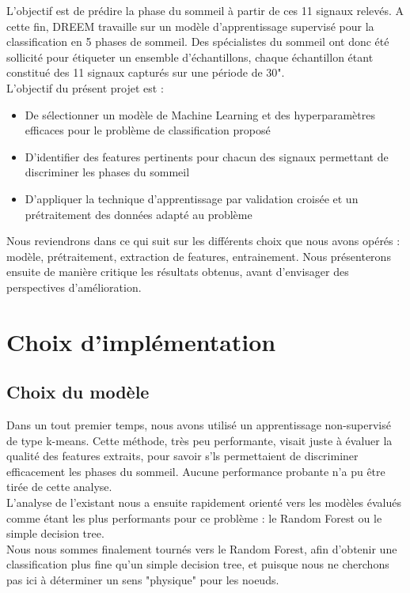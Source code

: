 \documentclass{article}
\begin{document}
L'objectif est de prédire la phase du sommeil à partir de ces 11 signaux relevés. A cette fin, DREEM travaille sur un modèle d'apprentissage supervisé pour la classification en 5 phases de sommeil. Des spécialistes du sommeil ont donc été sollicité pour étiqueter un ensemble d'échantillons, chaque échantillon étant constitué des 11 signaux capturés sur une période de 30".
\\
L'objectif du présent projet est :
\\
\begin{itemize}
\item De sélectionner un modèle de Machine Learning et des hyperparamètres efficaces pour le problème de classification proposé
\item D'identifier des features pertinents pour chacun des signaux permettant de discriminer les phases du sommeil
\item D'appliquer la technique d'apprentissage par validation croisée et un prétraitement des données adapté au problème
\end{itemize}
\vspace{0.5cm}

Nous reviendrons dans ce qui suit sur les différents choix que nous avons opérés : modèle, prétraitement, extraction de features, entrainement. Nous présenterons ensuite de manière critique les résultats obtenus, avant d'envisager des perspectives d'amélioration.

\section{Choix d'implémentation}
\subsection{Choix du modèle}

Dans un tout premier temps, nous avons utilisé un apprentissage non-supervisé de type k-means. Cette méthode, très peu performante, visait juste à évaluer la qualité des features extraits, pour savoir s'ls permettaient de discriminer efficacement les phases du sommeil. Aucune performance probante n'a pu être tirée de cette analyse.
\\

L'analyse de l'existant nous a ensuite rapidement orienté vers les modèles évalués comme étant les plus performants pour ce problème : le Random Forest ou le simple decision tree.
\\

Nous nous sommes finalement tournés vers le Random Forest, afin d'obtenir une classification plus fine qu'un simple decision tree, et puisque nous ne cherchons pas ici à déterminer un sens "physique" pour les noeuds.
\\
\end{document}
